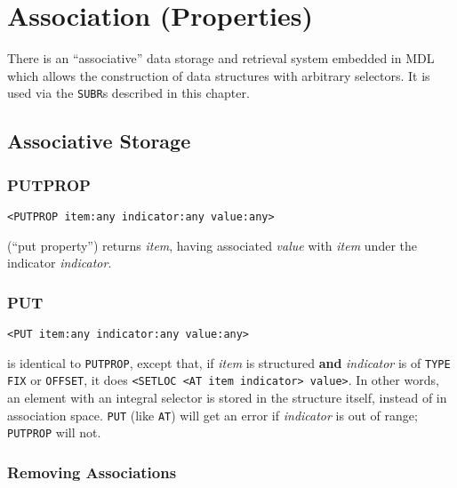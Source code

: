 \documentclass[a4paper]{scrbook}
\begin{document}
\chapter{Association (Properties)}\label{chapter-13.-association-properties}

There is an ``associative'' data storage and retrieval system embedded in MDL which allows the construction of data
structures with arbitrary selectors. It is used via the \texttt{SUBR}s described in this chapter.

\section{Associative Storage}\label{associative-storage}

\subsection{PUTPROP}\label{putprop}

\begin{verbatim}
<PUTPROP item:any indicator:any value:any>
\end{verbatim}

 (``put property'') returns \emph{item}, having associated \emph{value} with \emph{item}
under the indicator \emph{indicator}.

\subsection{PUT}\label{put}

\begin{verbatim}
<PUT item:any indicator:any value:any>
\end{verbatim}

 is identical to \texttt{PUTPROP}, except that, if \emph{item} is structured \textbf{and}
\emph{indicator} is of \texttt{TYPE} \texttt{FIX} or \texttt{OFFSET}, it does
\texttt{\textless{}SETLOC\ \textless{}AT\ item\ indicator\textgreater{}\ value\textgreater{}}. In other words, an element
with an integral selector is stored in the structure itself, instead of in association space. \texttt{PUT} (like
\texttt{AT}) will get an error if \emph{indicator} is out of range; \texttt{PUTPROP} will not.

\subsection{Removing Associations}\label{removing-associations}
\end{document}

